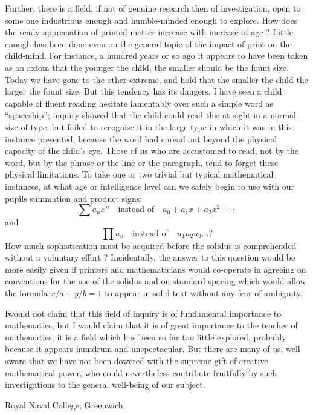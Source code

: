 Further, there is a field, if not of genuine research then of investigation, open to some one industrious enough and humble-minded enough to explore. How does the ready appreciation of printed matter increase with increase of age ? Little enough has been done even on the general topic of the impact of print on the child-mind. For instance, a hundred years or so ago it appears to have been taken as an axiom that the younger the child, the smaller should be the fount size. Today we have gone to the other extreme, and hold that the smaller the child the larger the fount size. But this tendency has its dangers. I have seen a child capable of fluent reading hesitate lamentably over such a simple word as ``spaceship''; inquiry showed that the child could read this at sight in a normal size of type, but failed to recognise it in the large type in which it was in this instance presented, because the word had spread out beyond the physical capacity of the child's eye. Those of us who are accustomed to read, not by the word, but by the phrase or the line or the paragraph, tend to forget these physical limitations. To take one or two trivial but typical mathematical instances, at what age or intelligence level can we safely begin to use with our pupils summation and product signs:
$$
\sum a_{n}x^{n}\quad\text{instead of}\quad a_{0}+a_{1}x+a_{2}x^{2}+\cdots
$$
and 
$$
\prod u_{n}\quad\text{instead of}\quad u_{1}u_{2}u_{3}\ldots ?
$$
How much sophistication must be acquired before the solidus is comprehended without a voluntary effort ? Incidentally, the answer to this question would be more easily given if printers and mathematicians would co-operate in agreeing on conventions for the use of the solidus and on standard spacing which would allow the formula $x/a+y/b=1$ to appear in solid text without any fear of ambiguity.

I\pageoriginale would not claim that this field of inquiry is of fundamental importance to mathematics, but I would claim that it is of great importance to the teacher of mathematics; it is a field which has been so far too little explored, probably because it appears humdrum and unspectacular. But there are many of us, well aware that we have not been dowered with the supreme gift of creative mathematical power, who could nevertheless contribute fruitfully by such investigations to the general well-being of our subject.

\bigskip
\medskip

{\fontsize{9pt}{11pt}\selectfont
Royal Naval College, Greenwich}\relax
